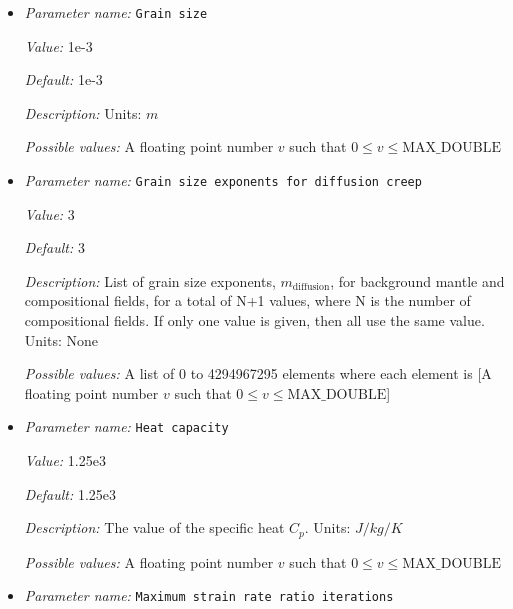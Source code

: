\begin{itemize}
{\it Default:} 1.0


{\it Description:} Scaling coefficient for effective viscosity.


{\it Possible values:} A floating point number $v$ such that $0 \leq v \leq \text{MAX\_DOUBLE}$
\item {\it Parameter name:} {\tt Grain size}
\label{parameters:Material model/Diffusion dislocation/Grain size}


{\it Value:} 1e-3


{\it Default:} 1e-3


{\it Description:} Units: $m$


{\it Possible values:} A floating point number $v$ such that $0 \leq v \leq \text{MAX\_DOUBLE}$
\item {\it Parameter name:} {\tt Grain size exponents for diffusion creep}
\label{parameters:Material model/Diffusion dislocation/Grain size exponents for diffusion creep}


{\it Value:} 3


{\it Default:} 3


{\it Description:} List of grain size exponents, $m_{\text{diffusion}}$, for background mantle and compositional fields, for a total of N+1 values, where N is the number of compositional fields. If only one value is given, then all use the same value.  Units: None


{\it Possible values:} A list of 0 to 4294967295 elements where each element is [A floating point number $v$ such that $0 \leq v \leq \text{MAX\_DOUBLE}$]
\item {\it Parameter name:} {\tt Heat capacity}
\label{parameters:Material model/Diffusion dislocation/Heat capacity}


{\it Value:} 1.25e3


{\it Default:} 1.25e3


{\it Description:} The value of the specific heat $C_p$. Units: $J/kg/K$


{\it Possible values:} A floating point number $v$ such that $0 \leq v \leq \text{MAX\_DOUBLE}$
\item {\it Parameter name:} {\tt Maximum strain rate ratio iterations}
\label{parameters:Material model/Diffusion dislocation/Maximum strain rate ratio iterations}



\end{itemize}
